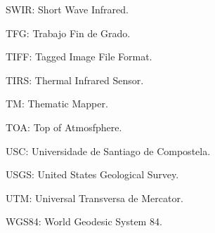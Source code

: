 SWIR: Short Wave Infrared.

TFG: Trabajo Fin de Grado.

TIFF: Tagged Image File Format.

TIRS: Thermal Infrared Sensor.

TM: Thematic Mapper.

TOA: Top of Atmosfphere.

USC: Universidade de Santiago de Compostela.

USGS: United States Geological Survey.

UTM: Universal Transversa de Mercator.

WGS84: World Geodesic System 84.
